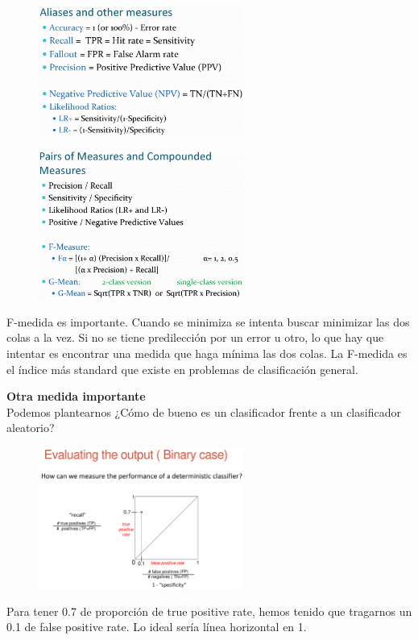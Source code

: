 \documentclass[11pt,a4paper]{article}
\theoremstyle{definition}
\begin{document}
	
	\begin{figure}[H]
		\centering
		\includegraphics[width=0.6\textwidth]{images/aliases_other_measures}
	\end{figure}
	
	\begin{figure}[H]
		\centering
		\includegraphics[width=0.6\textwidth]{images/f_measure}
	\end{figure}
	F-medida es importante. Cuando se minimiza se intenta buscar minimizar las dos colas a la vez. Si no se tiene predilección por un error u otro, lo que hay que intentar es encontrar una medida que haga mínima las dos colas. La F-medida es el índice más standard que existe en problemas de clasificación general.
	
	\textbf{Otra medida importante}\\
	Podemos plantearnos ¿Cómo de bueno es un clasificador frente a un clasificador aleatorio?
	
	\begin{figure}[H]
		\centering
		\includegraphics[width=0.6\textwidth]{images/eval_output_deter}
	\end{figure}
	Para tener 0.7 de proporción de true positive rate, hemos tenido que tragarnos un 0.1 de false positive rate. Lo ideal sería línea horizontal en 1.\\
	
\end{document}
